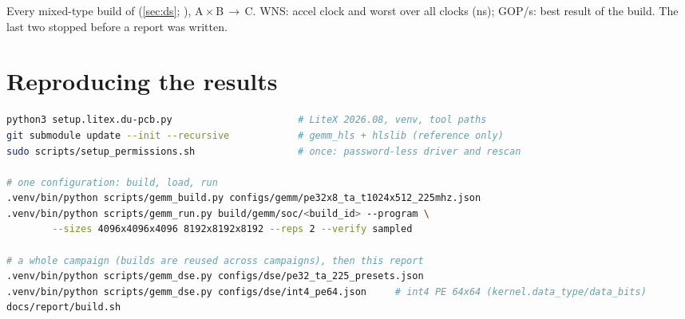 \begin{table}[ht]
\centering\scriptsize\setlength{\tabcolsep}{3pt}
\caption{Every mixed-type build of  (\cref{sec:ds}; ),
  A\,\(\times\)\,B\,\(\to\)\,C. WNS: accel clock and worst over all clocks (ns); GOP/s: best result of the build. The
  last two stopped before a report was written.}
\label{tab:ds-builds}
\end{table}

\section{Reproducing the results}
\label{app:repro}
\begin{lstlisting}[language=bash, caption={From a clean checkout (Vivado/Vitis 2026.1, the card in a PCIe slot).}]
python3 setup.litex.du-pcb.py                      # LiteX 2026.08, venv, tool paths
git submodule update --init --recursive            # gemm_hls + hlslib (reference only)
sudo scripts/setup_permissions.sh                  # once: password-less driver and rescan

# one configuration: build, load, run
.venv/bin/python scripts/gemm_build.py configs/gemm/pe32x8_ta_t1024x512_225mhz.json
.venv/bin/python scripts/gemm_run.py build/gemm/soc/<build_id> --program \
        --sizes 4096x4096x4096 8192x8192x8192 --reps 2 --verify sampled

# a whole campaign (builds are reused across campaigns), then this report
.venv/bin/python scripts/gemm_dse.py configs/dse/pe32_ta_225_presets.json
.venv/bin/python scripts/gemm_dse.py configs/dse/int4_pe64.json     # int4 PE 64x64 (kernel.data_type/data_bits)
docs/report/build.sh
\end{lstlisting}

